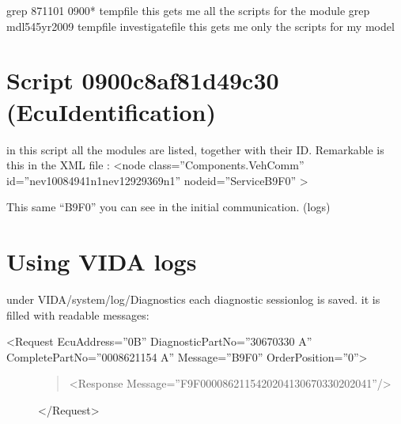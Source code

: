 \documentclass[letterpaper,10pt,english]{sphinxmanual}
\begin{document}
\begin{sphinxVerbatim}[commandchars=\\\{\}]
grep 871101 0900* \PYGZgt{} tempfile \PYGZsh{} this gets me all the scripts for the module
grep mdl545yr2009 tempfile \PYGZgt{} investigatefile \PYGZsh{} this gets me only the scripts for my model
\end{sphinxVerbatim}


\section{Script 0900c8af81d49c30 (EcuIdentification)}
\label{\detokenize{volvo-diagnostic:script-0900c8af81d49c30-ecuidentification}}
\sphinxAtStartPar
in this script all the modules are listed, together with their ID.
Remarkable is this in the XML file :
\textless{}node class=”Components.VehComm” id=”nev10084941n1\sphinxhyphen{}nev12929369n1” nodeid=”ServiceB9F0”  \textgreater{}

\sphinxAtStartPar
This same “B9F0” you can see in the initial communication. (logs)


\section{Using VIDA logs}
\label{\detokenize{volvo-diagnostic:using-vida-logs}}
\sphinxAtStartPar
under VIDA/system/log/Diagnostics each diagnostic sessionlog is saved.
it is filled with readable messages:
\begin{description}
\item[{\textless{}Request EcuAddress=”0B” DiagnosticPartNo=”30670330  A” CompletePartNo=”0008621154  A” Message=”B9F0” OrderPosition=”0”\textgreater{}}] \leavevmode\begin{quote}

\sphinxAtStartPar
\textless{}Response Message=”F9F0000862115420204130670330202041”/\textgreater{}
\end{quote}

\sphinxAtStartPar
\textless{}/Request\textgreater{}

\end{description}
\end{document}
